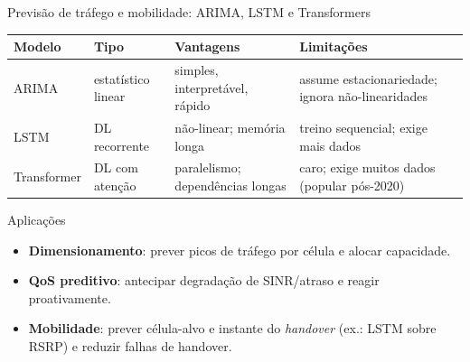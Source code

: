 \documentclass[aspectratio=169,11pt]{beamer}
\begin{document}
\begin{frame}{Previsão de tráfego e mobilidade: ARIMA, LSTM e Transformers}
  \begin{center}
    \scriptsize
    \begin{tabularx}{\textwidth}{@{}lXXX@{}}
      \toprule
      \textbf{Modelo} & \textbf{Tipo} & \textbf{Vantagens} & \textbf{Limitações}\\
      \midrule
      ARIMA & estatístico linear & simples, interpretável, rápido & assume estacionariedade; ignora não-linearidades\\
      LSTM & DL recorrente & não-linear; memória longa & treino sequencial; exige mais dados\\
      Transformer & DL com atenção & paralelismo; dependências longas & caro; exige muitos dados (popular pós-2020)\\
      \bottomrule
    \end{tabularx}
  \end{center}
  \begin{block}{Aplicações}
    \begin{itemize}
      \item \textbf{Dimensionamento}: prever picos de tráfego por célula e alocar capacidade.
      \item \textbf{QoS preditivo}: antecipar degradação de SINR/atraso e reagir proativamente.
      \item \textbf{Mobilidade}: prever célula-alvo e instante do \emph{handover} (ex.: LSTM sobre RSRP) e reduzir falhas de handover.
    \end{itemize}
  \end{block}
\end{frame}
\end{document}
